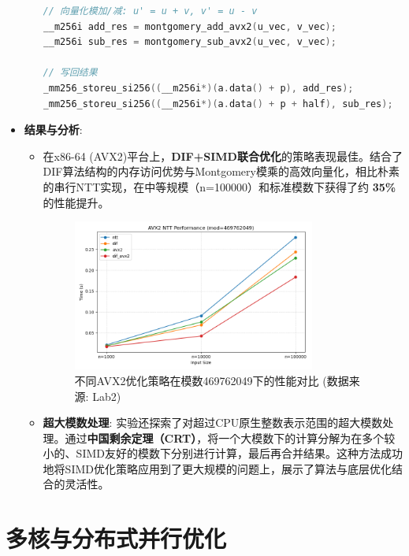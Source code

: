 \documentclass[a4paper]{article}
\begin{document}
\begin{itemize}
\begin{enumerate}
\begin{lstlisting}[language=C++]
// 向量化模加/减: u' = u + v, v' = u - v
__m256i add_res = montgomery_add_avx2(u_vec, v_vec);
__m256i sub_res = montgomery_sub_avx2(u_vec, v_vec);

// 写回结果
_mm256_storeu_si256((__m256i*)(a.data() + p), add_res);
_mm256_storeu_si256((__m256i*)(a.data() + p + half), sub_res);
        \end{lstlisting}
    \end{enumerate}
    \item \textbf{结果与分析}:
    \begin{itemize}
        \item 在x86-64 (AVX2)平台上，\textbf{DIF+SIMD联合优化}的策略表现最佳。结合了DIF算法结构的内存访问优势与Montgomery模乘的高效向量化，相比朴素的串行NTT实现，在中等规模（n=100000）和标准模数下获得了约 \textbf{35\%} 的性能提升。
        \begin{figure}[H]
            \centering
            \includegraphics[width=0.8\textwidth]{fig/avx2_469762049.png}
            \caption{不同AVX2优化策略在模数469762049下的性能对比 (数据来源: Lab2)}
            \label{fig:avx2_perf}
        \end{figure}
        \item \textbf{超大模数处理}: 实验还探索了对超过CPU原生整数表示范围的超大模数处理。通过\textbf{中国剩余定理（CRT）}，将一个大模数下的计算分解为在多个较小的、SIMD友好的模数下分别进行计算，最后再合并结果。这种方法成功地将SIMD优化策略应用到了更大规模的问题上，展示了算法与底层优化结合的灵活性。
    \end{itemize}
\end{itemize}

\section{多核与分布式并行优化}
\end{document}
